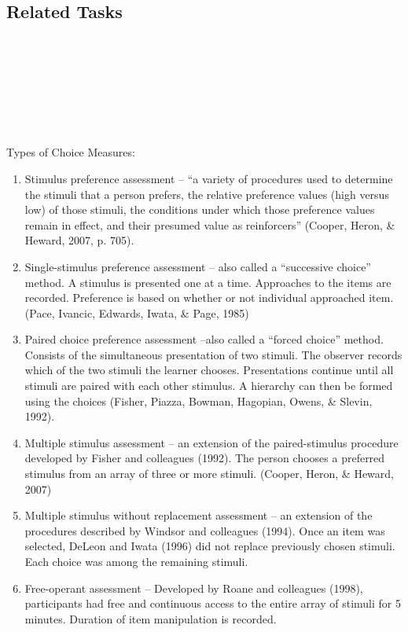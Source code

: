 \subsection{Related Tasks}
\fouraTwelve{}\\
\fourhOne{}\\
\fouriOne{}\\
\fourFKFourtySeven{}\\
\fourFKFourtyEight{}\\
%
%
%
%
%
%
\section{\fouraFourteen{}}
Types of Choice Measures:
\begin{enumerate}
\item Stimulus preference assessment – ``a variety of procedures used to determine the stimuli that a person prefers, the relative preference values (high versus low) of those stimuli, the conditions under which those preference values remain in effect, and their presumed value as reinforcers'' (Cooper, Heron, \& Heward, 2007, p. 705).
\item Single-stimulus preference assessment – also called a ``successive choice'' method. A stimulus is presented one at a time. Approaches to the items are recorded. Preference is based on whether or not individual approached item. (Pace, Ivancic, Edwards, Iwata, \& Page, 1985)
\item Paired choice preference assessment –also called a ``forced choice'' method. Consists of the simultaneous presentation of two stimuli. The observer records which of the two stimuli the learner chooses. Presentations continue until all stimuli are paired with each other stimulus. A hierarchy can then be formed using the choices (Fisher, Piazza, Bowman, Hagopian, Owens, \& Slevin, 1992).
\item Multiple stimulus assessment – an extension of the paired-stimulus procedure developed by Fisher and colleagues (1992). The person chooses a preferred stimulus from an array of three or more stimuli. (Cooper, Heron, \& Heward, 2007)
\item Multiple stimulus without replacement assessment – an extension of the procedures described by Windsor and colleagues (1994). Once an item was selected, DeLeon and Iwata (1996) did not replace previously chosen stimuli. Each choice was among the remaining stimuli. 
\item Free-operant assessment – Developed by Roane and colleagues (1998), participants had free and continuous access to the entire array of stimuli for 5 minutes. Duration of item manipulation is recorded. 

\end{enumerate}
